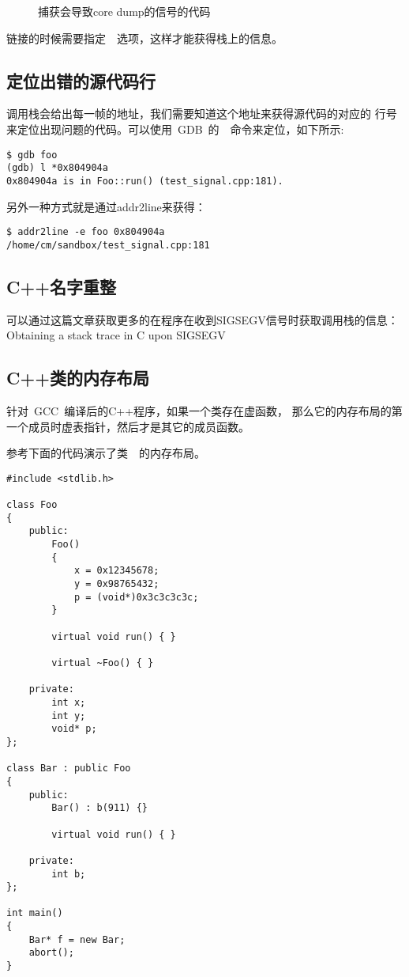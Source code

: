 
\begin{figure}
\caption{捕获会导致core dump的信号的代码}
\end{figure}

链接的时候需要指定~~选项，这样才能获得栈上的信息。

\subsection{定位出错的源代码行}
调用栈会给出每一帧的地址，我们需要知道这个地址来获得源代码的对应的
行号来定位出现问题的代码。可以使用~GDB~的~~命令来定位，如下所示:
\begin{lstlisting}
$ gdb foo
(gdb) l *0x804904a
0x804904a is in Foo::run() (test_signal.cpp:181).
\end{lstlisting}

另外一种方式就是通过addr2line来获得：
\begin{lstlisting}
$ addr2line -e foo 0x804904a
/home/cm/sandbox/test_signal.cpp:181
\end{lstlisting}

\subsection{C++名字重整}

可以通过这篇文章获取更多的在程序在收到SIGSEGV信号时获取调用栈的信息：\\
Obtaining a stack trace in C upon SIGSEGV\cite{obtain-sigsegv-stack}

\subsection{C++类的内存布局}

针对~GCC~编译后的C++程序，如果一个类存在虚函数，
那么它的内存布局的第一个成员时虚表指针，然后才是其它的成员函数。

参考下面的代码演示了类~~的内存布局。

\begin{lstlisting}
#include <stdlib.h>

class Foo
{
    public:
        Foo()
        {
            x = 0x12345678;
            y = 0x98765432;
            p = (void*)0x3c3c3c3c;
        }

        virtual void run() { }

        virtual ~Foo() { }

    private:
        int x;
        int y;
        void* p;
};

class Bar : public Foo
{
    public:
        Bar() : b(911) {}

        virtual void run() { }

    private:
        int b;
};

int main()
{
    Bar* f = new Bar;
    abort();
}
\end{lstlisting}

